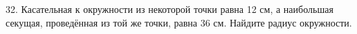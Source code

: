 32. Касательная к окружности из некоторой точки равна 12 см, а наибольшая секущая, проведённая из той же точки, равна 36 см. Найдите радиус окружности.\\

